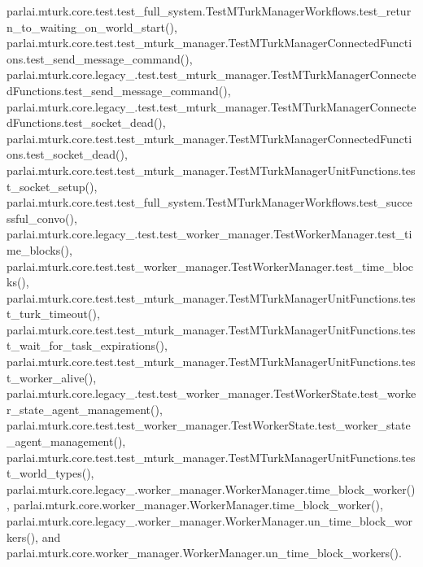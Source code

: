 parlai.\+mturk.\+core.\+test.\+test\+\_\+full\+\_\+system.\+Test\+M\+Turk\+Manager\+Workflows.\+test\+\_\+return\+\_\+to\+\_\+waiting\+\_\+on\+\_\+world\+\_\+start(), parlai.\+mturk.\+core.\+test.\+test\+\_\+mturk\+\_\+manager.\+Test\+M\+Turk\+Manager\+Connected\+Functions.\+test\+\_\+send\+\_\+message\+\_\+command(), parlai.\+mturk.\+core.\+legacy\+\_.\+test.\+test\+\_\+mturk\+\_\+manager.\+Test\+M\+Turk\+Manager\+Connected\+Functions.\+test\+\_\+send\+\_\+message\+\_\+command(), parlai.\+mturk.\+core.\+legacy\+\_.\+test.\+test\+\_\+mturk\+\_\+manager.\+Test\+M\+Turk\+Manager\+Connected\+Functions.\+test\+\_\+socket\+\_\+dead(), parlai.\+mturk.\+core.\+test.\+test\+\_\+mturk\+\_\+manager.\+Test\+M\+Turk\+Manager\+Connected\+Functions.\+test\+\_\+socket\+\_\+dead(), parlai.\+mturk.\+core.\+test.\+test\+\_\+mturk\+\_\+manager.\+Test\+M\+Turk\+Manager\+Unit\+Functions.\+test\+\_\+socket\+\_\+setup(), parlai.\+mturk.\+core.\+test.\+test\+\_\+full\+\_\+system.\+Test\+M\+Turk\+Manager\+Workflows.\+test\+\_\+successful\+\_\+convo(), parlai.\+mturk.\+core.\+legacy\+\_.\+test.\+test\+\_\+worker\+\_\+manager.\+Test\+Worker\+Manager.\+test\+\_\+time\+\_\+blocks(), parlai.\+mturk.\+core.\+test.\+test\+\_\+worker\+\_\+manager.\+Test\+Worker\+Manager.\+test\+\_\+time\+\_\+blocks(), parlai.\+mturk.\+core.\+test.\+test\+\_\+mturk\+\_\+manager.\+Test\+M\+Turk\+Manager\+Unit\+Functions.\+test\+\_\+turk\+\_\+timeout(), parlai.\+mturk.\+core.\+test.\+test\+\_\+mturk\+\_\+manager.\+Test\+M\+Turk\+Manager\+Unit\+Functions.\+test\+\_\+wait\+\_\+for\+\_\+task\+\_\+expirations(), parlai.\+mturk.\+core.\+test.\+test\+\_\+mturk\+\_\+manager.\+Test\+M\+Turk\+Manager\+Unit\+Functions.\+test\+\_\+worker\+\_\+alive(), parlai.\+mturk.\+core.\+legacy\+\_.\+test.\+test\+\_\+worker\+\_\+manager.\+Test\+Worker\+State.\+test\+\_\+worker\+\_\+state\+\_\+agent\+\_\+management(), parlai.\+mturk.\+core.\+test.\+test\+\_\+worker\+\_\+manager.\+Test\+Worker\+State.\+test\+\_\+worker\+\_\+state\+\_\+agent\+\_\+management(), parlai.\+mturk.\+core.\+test.\+test\+\_\+mturk\+\_\+manager.\+Test\+M\+Turk\+Manager\+Unit\+Functions.\+test\+\_\+world\+\_\+types(), parlai.\+mturk.\+core.\+legacy\+\_.\+worker\+\_\+manager.\+Worker\+Manager.\+time\+\_\+block\+\_\+worker(), parlai.\+mturk.\+core.\+worker\+\_\+manager.\+Worker\+Manager.\+time\+\_\+block\+\_\+worker(), parlai.\+mturk.\+core.\+legacy\+\_.\+worker\+\_\+manager.\+Worker\+Manager.\+un\+\_\+time\+\_\+block\+\_\+workers(), and parlai.\+mturk.\+core.\+worker\+\_\+manager.\+Worker\+Manager.\+un\+\_\+time\+\_\+block\+\_\+workers().

